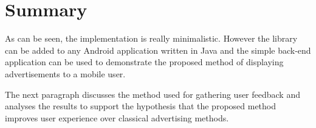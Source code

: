 \section{Summary}

As can be seen, the implementation is really minimalistic. However the library can be added to any Android application written in Java and the simple back-end application can be used to demonstrate the proposed method of displaying advertisements to a mobile user.

The next paragraph discusses the method used for gathering user feedback and analyses the results to support the hypothesis that the proposed method improves user experience over classical advertising methods.